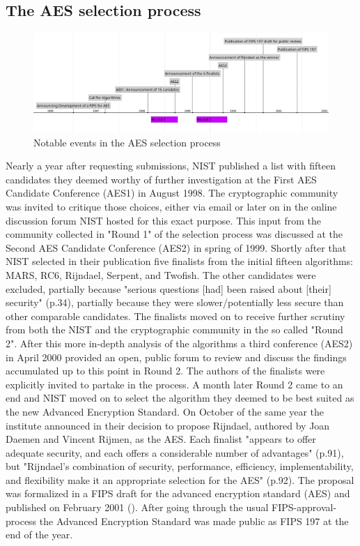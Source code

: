 \subsection{The AES selection process}
\label{ch:aes}

\begin{figure}
  \centering
  \includegraphics[scale=0.37]{data/figures/aes-process-timeline.png}
  \caption{Notable events in the AES selection process}
  \label{fig:procestimeline}
\end{figure}

Nearly a year after requesting submissions, NIST published a list with fifteen candidates they deemed worthy of further investigation at the First AES Candidate Conference (AES1) in August 1998. The cryptographic community was invited to critique those choices, either via email or later on in the online discussion forum NIST hosted for this exact purpose. This input from the community collected in "Round 1" of the selection process was discussed at the Second AES Candidate Conference (AES2) in spring of 1999. Shortly after that NIST selected in their publication \cite{round1report} five finalists from the initial fifteen algorithms: MARS, RC6, Rijndael, Serpent, and Twofish.
The other candidates were excluded, partially because "serious questions [had] been raised about [their] security" (p.34), partially because they were slower/potentially less secure than other comparable candidates.
The finalists moved on to receive further scrutiny from both the NIST and the cryptographic community in the so called "Round 2".
After this more in-depth analysis of the algorithms a third conference (AES2) in April 2000 provided an open, public forum to review and discuss the findings accumulated up to this point in Round 2. The authors of the finalists were explicitly invited to partake in the process. A month later Round 2 came to an end and NIST moved on to select the algorithm they deemed to be best suited as the new Advanced Encryption Standard.
On October of the same year the institute announced in \cite{round2report} their decision to propose Rijndael, authored by Joan Daemen and Vincent Rijmen, as the AES. Each finalist "appears  to  offer adequate security, and each offers a considerable number of advantages" (p.91), but "Rijndael’s combination of security, performance, efficiency, implementability, and flexibility make it an appropriate selection for the AES" (p.92).
The proposal was formalized in a FIPS draft for the advanced encryption standard (AES) and published on February 2001 (\cite{fipsdraft}). After going through the usual FIPS-approval-process the Advanced Encryption Standard was made public as FIPS 197 \cite{fips197} at the end of the year.

